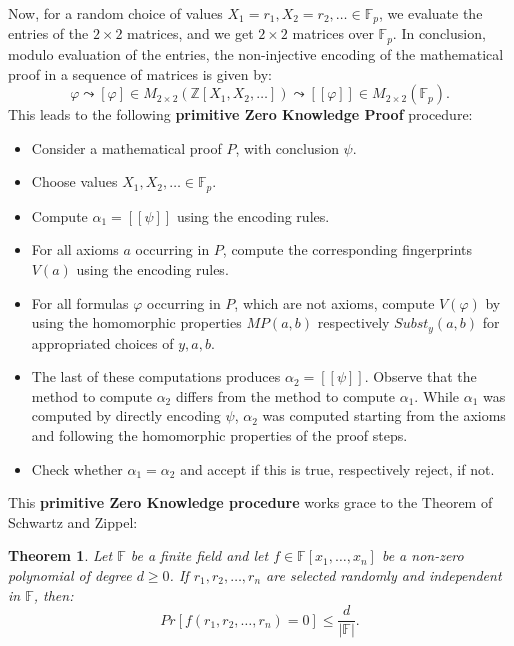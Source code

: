 \documentclass{article}
\theoremstyle{plain}
\newtheorem{theorem}{Theorem}[section]
\theoremstyle{definition}
\begin{document}
Now, for a random choice of values $X_1 = r_1, X_2 = r_2, \dots \in \mathbb F_p$, we evaluate the entries of the $2 \times 2$ matrices, and we get $2 \times 2$ matrices over $\mathbb F_p$. In conclusion, modulo evaluation of the entries, the non-injective encoding of the mathematical proof in a sequence of matrices is given by:
$$\varphi \leadsto [\varphi] \in M_{2 \times 2}(\mathbb Z[X_1, X_2, \dots]) \leadsto [[\varphi]] \in M_{2\times 2}(\mathbb F_p).$$
This leads to the following {\bf primitive Zero Knowledge Proof} procedure: 
\begin{itemize}
\item Consider a mathematical proof $P$, with conclusion $\psi$.

\item Choose values $X_1, X_2, \dots \in \mathbb F_p$.

\item Compute $\alpha_1 = [[\psi]]$ using the encoding rules.

\item For all axioms $a$ occurring in $P$, compute the corresponding fingerprints $V(a)$ using the encoding rules.

\item For all formulas $\varphi$ occurring in $P$, which are not axioms, compute $V(\varphi)$ by using the homomorphic properties $MP(a, b)$ respectively $Subst_y(a, b)$ for appropriated choices of $y, a, b$.

\item The last of these computations produces $\alpha_2=[[\psi]]$. Observe that the method to compute $\alpha_2$ differs from the method to compute $\alpha_1$. While $\alpha_1$ was computed by directly encoding $\psi$, $\alpha_2$ was computed starting from the axioms and following the homomorphic properties of the proof steps.

\item Check whether $\alpha_1 = \alpha_2$ and accept if this is true, respectively reject, if not. 
\end{itemize} 

This {\bf primitive Zero Knowledge procedure} works grace to the Theorem of Schwartz and Zippel:

\begin{theorem}
    Let $\mathbb F$ be a finite field and let $f \in \mathbb F[x_1, \dots, x_n]$ be a non-zero polynomial of degree $d \geq 0$. If $r_1, r_2, \dots, r_n$ are selected randomly and independent in $\mathbb F$, then:
    $$ Pr[f(r_1, r_2, \dots, r_n) = 0] \leq \frac{d}{|\mathbb F|}.$$
\end{theorem} 
\end{document}
